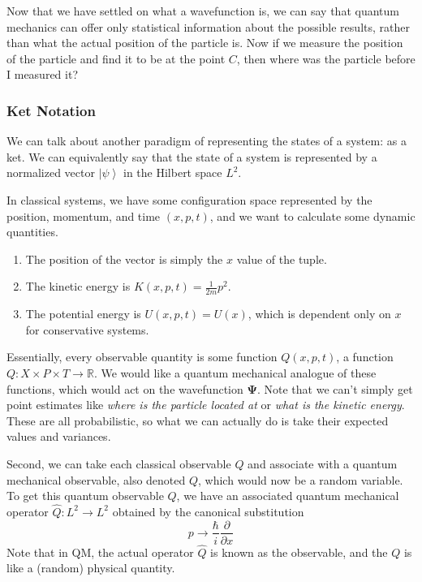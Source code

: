 \documentclass{article}
\newcommand{\ket}[1]{\ensuremath{\left|#1\right\rangle}}
\theoremstyle{definition}
\begin{document}
    Now that we have settled on what a wavefunction is, we can say that quantum mechanics can offer only statistical information about the possible results, rather than what the actual position of the particle is. Now if we measure the position of the particle and find it to be at the point $C$, then where was the particle before I measured it? 

    \subsubsection{Ket Notation} 

      We can talk about another paradigm of representing the states of a system: as a ket. We can equivalently say that the state of a system is represented by a normalized vector $\ket{\psi}$ in the Hilbert space $L^2$. 

      In classical systems, we have some configuration space represented by the position, momentum, and time $(x, p, t)$, and we want to calculate some dynamic quantities. 
      \begin{enumerate} 
        \item The position of the vector is simply the $x$ value of the tuple. 
        \item The kinetic energy is $K(x, p, t) = \frac{1}{2m} p^2$. 
        \item The potential energy is $U(x, p, t) = U(x)$, which is dependent only on $x$ for conservative systems. 
      \end{enumerate}
      Essentially, every observable quantity is some function $Q(x, p, t)$, a function $Q: X \times P \times T \rightarrow \mathbb{R}$. We would like a quantum mechanical analogue of these functions, which would act on the wavefunction $\boldsymbol{\Psi}$. Note that we can't simply get point estimates like \textit{where is the particle located at} or \textit{what is the kinetic energy}. These are all probabilistic, so what we can actually do is take their expected values and variances. 

      Second, we can take each classical observable $Q$ and associate with a quantum mechanical observable, also denoted $Q$, which would now be a random variable. To get this quantum observable $Q$, we have an associated quantum mechanical operator $\hat{Q}: L^2 \rightarrow L^2$ obtained by the canonical substitution 
      \begin{equation} 
        p \rightarrow \frac{\hbar}{i} \frac{\partial}{\partial x} 
      \end{equation}
      Note that in QM, the actual operator $\hat{Q}$ is known as the observable, and the $Q$ is like a (random) physical quantity. 
\end{document}
